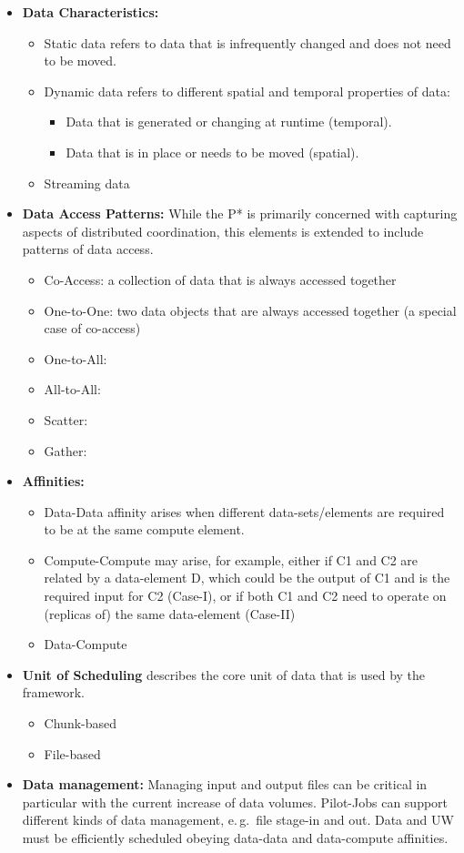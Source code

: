\documentclass[conference,final]{IEEEtran}
\begin{document}
\begin{itemize}
    \item \textbf{Data Characteristics:}
    \begin{itemize}
    \item Static data refers to data that is infrequently changed and does not 
	need to be moved.
    \item Dynamic data refers to different spatial and temporal properties of 
	data:
    \begin{itemize}
    	\item Data that is generated or changing at runtime (temporal).
    	\item Data that is in place or needs to be moved (spatial).
    \end{itemize}
	\item Streaming data
    \end{itemize}  
	\item \textbf{Data Access Patterns: } While the P* is 
	primarily concerned with capturing aspects of distributed coordination, this 
	elements is extended to include patterns of data access.
	\begin{itemize}
		\item Co-Access: a collection of data that is always accessed together
		\item One-to-One: two data objects that are always accessed together (a 
		special case of co-access)
		\item One-to-All:
		\item All-to-All:
		\item Scatter:
		\item Gather:
	\end{itemize}      
    \item \textbf{Affinities:}
    \begin{itemize}
        \item Data-Data affinity arises when different data-sets/elements are 
		required to be at the same compute element.
		\item Compute-Compute may arise, for example, either if C1 and C2 are 
		related by a data-element D, which could be the output of C1 and is the 
		required input for C2 (Case-I), or if both C1 and C2 need to operate on 
		(replicas of) the same data-element (Case-II)
        \item Data-Compute		
    \end{itemize}
    \item \textbf{Unit of Scheduling} describes the core unit of data that is 
	used by the framework.
    \begin{itemize}
        \item Chunk-based
        \item File-based
    \end{itemize}
	\item \textbf{Data management:} Managing input and output files can be 
		critical in particular with the current increase of data volumes. 
		Pilot-Jobs can support different kinds of data management, e.\,g.\ file 
		stage-in and 
		out. Data and UW must be efficiently scheduled obeying data-data and 
		data-compute affinities. 


\end{itemize}
\end{document}
